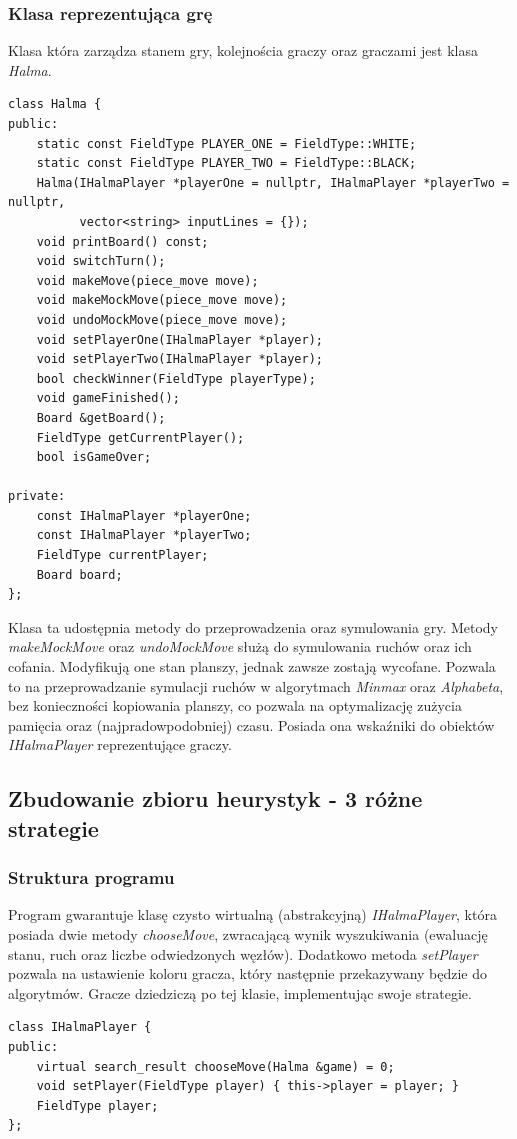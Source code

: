 \documentclass[a4paper, 12pt]{article}
\begin{document}
\subsubsection{Klasa reprezentująca grę}
Klasa która zarządza stanem gry, kolejnościa graczy oraz 
graczami jest klasa \textit{Halma}.
\begin{lstlisting}
class Halma {
public:
    static const FieldType PLAYER_ONE = FieldType::WHITE;
    static const FieldType PLAYER_TWO = FieldType::BLACK;
    Halma(IHalmaPlayer *playerOne = nullptr, IHalmaPlayer *playerTwo = nullptr,
          vector<string> inputLines = {});
    void printBoard() const;
    void switchTurn();
    void makeMove(piece_move move);
    void makeMockMove(piece_move move);
    void undoMockMove(piece_move move);
    void setPlayerOne(IHalmaPlayer *player);
    void setPlayerTwo(IHalmaPlayer *player);
    bool checkWinner(FieldType playerType);
    void gameFinished();
    Board &getBoard();
    FieldType getCurrentPlayer();
    bool isGameOver;

private:
    const IHalmaPlayer *playerOne;
    const IHalmaPlayer *playerTwo;
    FieldType currentPlayer;
    Board board;
};
\end{lstlisting}
Klasa ta udostępnia metody do przeprowadzenia oraz symulowania gry. 
Metody \textit{makeMockMove} oraz \textit{undoMockMove} służą do
symulowania ruchów oraz ich cofania. Modyfikują one stan planszy,
jednak zawsze zostają wycofane. Pozwala to na przeprowadzanie 
symulacji ruchów w algorytmach \textit{Minmax} oraz \textit{Alphabeta}, 
bez konieczności kopiowania planszy, co pozwala na optymalizację 
zużycia pamięcia oraz (najpradowpodobniej) czasu. 
Posiada ona wskaźniki do obiektów \textit{IHalmaPlayer} reprezentujące
graczy.


\subsection{Zbudowanie zbioru heurystyk - 3 różne strategie}
\subsubsection{Struktura programu} 
Program gwarantuje klasę czysto wirtualną (abstrakcyjną) \textit{IHalmaPlayer},
która posiada dwie metody \textit{chooseMove}, zwracającą
wynik wyszukiwania (ewaluację stanu, ruch oraz liczbe odwiedzonych 
węzłów). Dodatkowo metoda \textit{setPlayer} pozwala na ustawienie
koloru gracza, który następnie przekazywany będzie do algorytmów.
Gracze dziedziczą po tej klasie, implementując swoje strategie.
\begin{lstlisting}
class IHalmaPlayer {
public:
    virtual search_result chooseMove(Halma &game) = 0;
    void setPlayer(FieldType player) { this->player = player; }
    FieldType player;
};
\end{lstlisting}
\end{document}

